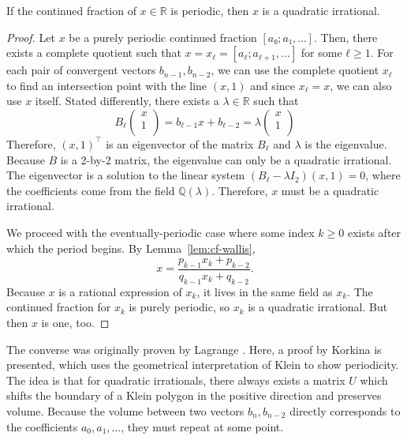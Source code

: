 \begin{theorem}
  If the continued fraction of $x ∈ ℝ$ is periodic, then $x$ is a quadratic irrational.
\end{theorem}

\begin{proof}
  Let $x$ be a purely periodic continued fraction $[a₀; a₁, …]$.
  Then, there exists a complete quotient such that $x = x_ℓ = [a_ℓ; a_{ℓ+1}, …]$ for some $ℓ ≥ 1$.
  For each pair of convergent vectors $b_{n-1}, b_{n-2}$, we can use the
  complete quotient $x_ℓ$ to find an intersection point with the line $(x, 1)$
  and since $x_ℓ = x$, we can also use $x$ itself.
  Stated differently, there exists a $λ ∈ ℝ$ such that
  \[
    B_ℓ
    \begin{pmatrix}
      x \\
      1 \\
    \end{pmatrix}
    =
    b_{ℓ-1} x + b_{ℓ-2}
    = λ
    \begin{pmatrix}
      x \\
      1 \\
    \end{pmatrix}
  \]
  Therefore, $(x, 1)^⊤$ is an eigenvector of the matrix $B_ℓ$
  and $λ$ is the eigenvalue.
  Because $B$ is a 2-by-2 matrix,
  the eigenvalue can only be a quadratic irrational.
  The eigenvector is a solution to the linear system $(B_ℓ - λ I_2) (x, 1) = 0$,
  where the coefficients come from the field $ℚ(λ)$.
  Therefore, $x$ must be a quadratic irrational.

  We proceed with the eventually-periodic case
  where some index $k ≥ 0$ exists after which the period begins.
  By Lemma~\ref{lem:cf-wallis},
  \[
    x = \frac{p_{k-1} x_k + p_{k-2}}{q_{k-1} x_k + q_{k-2}}.
  \]
  Because $x$ is a rational expression of $x_k$,
  it lives in the same field as $x_k$.
  The continued fraction for $x_k$ is purely periodic, so $x_k$ is a quadratic irrational.
  But then $x$ is one, too.
\end{proof}

The converse was originally proven by Lagrange \cite{Lagrange70}.
Here, a proof by Korkina \cite{Korkina96} is presented,
which uses the geometrical interpretation of Klein to show periodicity.
The idea is that for quadratic irrationals,
there always exists a matrix $U$ which shifts the boundary of a Klein polygon
in the positive direction and preserves volume.
Because the volume between two vectors $b_n, b_{n-2}$ directly corresponds to
the coefficients $a_0, a_1, …$, they must repeat at some point.

